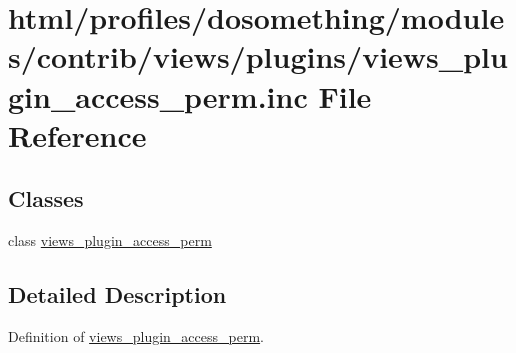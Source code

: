 \hypertarget{views__plugin__access__perm_8inc}{
\section{html/profiles/dosomething/modules/contrib/views/plugins/views\_\-plugin\_\-access\_\-perm.inc File Reference}
\label{views__plugin__access__perm_8inc}
}
\subsection*{Classes}
\begin{DoxyCompactItemize}
\item 
class \hyperlink{classviews__plugin__access__perm}{views\_\-plugin\_\-access\_\-perm}
\end{DoxyCompactItemize}


\subsection{Detailed Description}
Definition of \hyperlink{classviews__plugin__access__perm}{views\_\-plugin\_\-access\_\-perm}. 